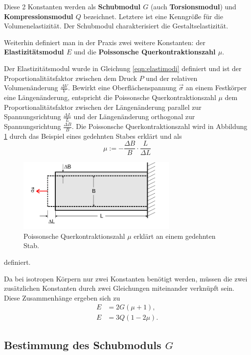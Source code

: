 Diese 2 Konstanten werden als \textbf{Schubmodul $G$} (auch \textbf{Torsionsmodul}) und
\textbf{Kompressionsmodul $Q$} bezeichnet.
Letztere ist eine Kenngröße für die Volumenelastizität. Der Schubmodul charakterisiert die
Gestaltselastizität.

Weiterhin definiert man in der Praxis zwei weitere Konstanten: der
\textbf{Elastizitätsmodul $E$} und die \textbf{Poissonsche Querkontraktionszahl $\mu$}.

Der Elastizitätsmodul wurde in Gleichung \eqref{eqn:elastimodi} definiert und ist der
Proportionalitätsfaktor zwischen dem Druck $P$ und der relativen Volumenänderung
$\frac{\Delta V}{V}$.
Bewirkt eine Oberflächenspannung $\vec{\sigma}$ an einem Festkörper eine Längenänderung,
entspricht die Poissonsche Querkontraktionszahl $\mu$ dem Proportionalitätsfaktor zwischen
der Längenänderung parallel zur Spannungsrichtung $\frac{\Delta L}{L}$ und der Längenänderung
orthogonal zur Spannungsrichtung $\frac{\Delta B}{B}$. Die Poissonsche Querkontraktionszahl
wird in Abbildung \ref{fig:querkontrakti} durch das Beispiel eines gedehnten Stabes erklärt und
als
\begin{equation*}
	\mu := - \frac{\Delta B}{B} \cdot \frac{L}{\Delta L}
\end{equation*}
\begin{figure}
	\centering
	\includegraphics[width=0.7\textwidth]{Bilder/Querkontraktion.png}
	\caption{Poissonsche Querkontraktionszahl $\mu$ erklärt an einem gedehnten Stab. \cite{Anleitung}}
	\label{fig:querkontrakti}
\end{figure}
definiert.

Da bei isotropen Körpern nur zwei Konstanten benötigt werden, müssen die zwei zusätzlichen
Konstanten durch zwei Gleichungen miteinander verknüpft sein.
Diese Zusammenhänge ergeben sich zu
\begin{align}
	\label{eqn:zusammenhang}
	E & = 2G (\mu + 1) \mathrm{,}  \\
	E & = 3Q (1 - 2\mu) \mathrm{.}
\end{align}
\FloatBarrier

\subsection{Bestimmung des Schubmoduls $G$}


